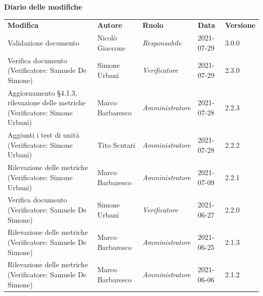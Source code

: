 \documentclass[a4paper]{article}
\begin{document}
\begin{center}
    \centering
    \textbf{\Large Diario delle modifiche}\\
    \vspace{10px}
    \renewcommand{\arraystretch}{1.8}
    \label{tab:Diario delle modifiche}
    \begin{longtable}[!h]{p{160px} p{80px} p{70px} p{55px} p{40px}}
        \rowcolor{logo!70} \textbf{Modifica}                                                     & \textbf{Autore}   & \textbf{Ruolo}          & \textbf{Data} & \textbf{Versione} \\
        Validazione documento                                                                    & Nicolò Giaccone   & \textit{Responsabile}   & 2021-07-29    & 3.0.0             \\
        Verifica documento \newline (Verificatore: Samuele De Simone)                             & Simone Urbani     & \textit{Verificatore}   & 2021-07-29    & 2.3.0             \\
        Aggiornamento \S 4.1.3, rilevazione delle metriche \newline (Verificatore: Simone Urbani) & Marco Barbaresco  & \textit{Amministratore} & 2021-07-28    & 2.2.3             \\
        Aggiunti i test di unità \newline (Verificatore: Simone Urbani)                           & Tito Scutari      & \textit{Amministratore} & 2021-07-28    & 2.2.2             \\
        Rilevazione delle metriche \newline (Verificatore: Simone Urbani)                         & Marco Barbaresco  & \textit{Amministratore} & 2021-07-09    & 2.2.1             \\
        Verifica documento \newline (Verificatore: Samuele De Simone)                             & Simone Urbani     & \textit{Verificatore}   & 2021-06-27    & 2.2.0             \\
        Rilevazione delle metriche \newline (Verificatore: Samuele De Simone)                     & Marco Barbaresco  & \textit{Amministratore} & 2021-06-25    & 2.1.3             \\
        Rilevazione delle metriche \newline (Verificatore: Samuele De Simone)                     & Marco Barbaresco  & \textit{Amministratore} & 2021-06-06    & 2.1.2             \\

\end{longtable}
\end{center}
\end{document}
